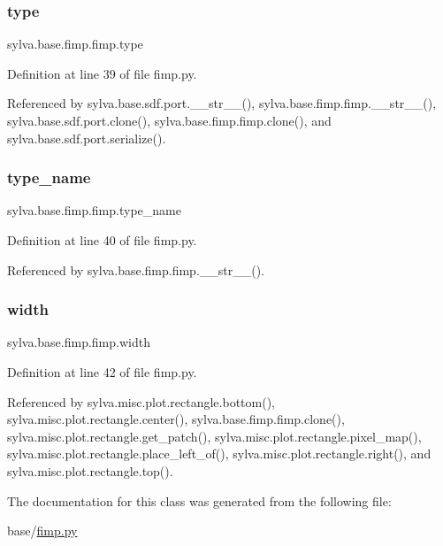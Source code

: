 \subsubsection{\texorpdfstring{type}{type}}
{\footnotesize\ttfamily sylva.\+base.\+fimp.\+fimp.\+type}



Definition at line 39 of file fimp.\+py.



Referenced by sylva.\+base.\+sdf.\+port.\+\_\+\+\_\+str\+\_\+\+\_\+(), sylva.\+base.\+fimp.\+fimp.\+\_\+\+\_\+str\+\_\+\+\_\+(), sylva.\+base.\+sdf.\+port.\+clone(), sylva.\+base.\+fimp.\+fimp.\+clone(), and sylva.\+base.\+sdf.\+port.\+serialize().

\mbox{\label{classsylva_1_1base_1_1fimp_1_1fimp_a0eb962cbafd47c9f28ad2859d6a64de2}} 
\subsubsection{\texorpdfstring{type\+\_\+name}{type\_name}}
{\footnotesize\ttfamily sylva.\+base.\+fimp.\+fimp.\+type\+\_\+name}



Definition at line 40 of file fimp.\+py.



Referenced by sylva.\+base.\+fimp.\+fimp.\+\_\+\+\_\+str\+\_\+\+\_\+().

\mbox{\label{classsylva_1_1base_1_1fimp_1_1fimp_af63a637b7584ab0fcd1a7702e9ee9003}} 
\subsubsection{\texorpdfstring{width}{width}}
{\footnotesize\ttfamily sylva.\+base.\+fimp.\+fimp.\+width}



Definition at line 42 of file fimp.\+py.



Referenced by sylva.\+misc.\+plot.\+rectangle.\+bottom(), sylva.\+misc.\+plot.\+rectangle.\+center(), sylva.\+base.\+fimp.\+fimp.\+clone(), sylva.\+misc.\+plot.\+rectangle.\+get\+\_\+patch(), sylva.\+misc.\+plot.\+rectangle.\+pixel\+\_\+map(), sylva.\+misc.\+plot.\+rectangle.\+place\+\_\+left\+\_\+of(), sylva.\+misc.\+plot.\+rectangle.\+right(), and sylva.\+misc.\+plot.\+rectangle.\+top().



The documentation for this class was generated from the following file\+:\begin{DoxyCompactItemize}
\item 
base/\hyperlink{fimp_8py}{fimp.\+py}\end{DoxyCompactItemize}
